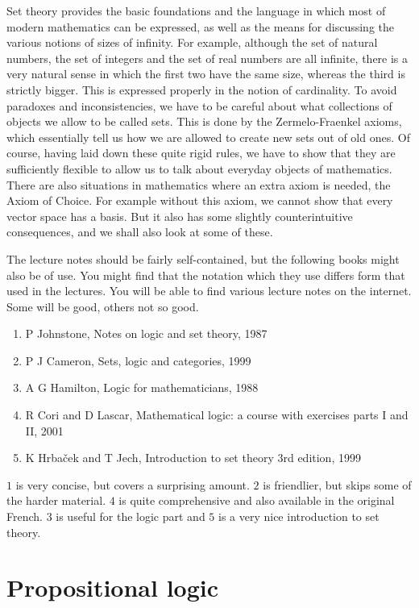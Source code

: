 \documentclass{article}
\theoremstyle{definition}\newtheorem{definition}{Definition}[subsection]
\theoremstyle{definition}\newtheorem{remark}[definition]{Remark}
\theoremstyle{definition}\newtheorem*{example}{Example}
\theoremstyle{definition}\newtheorem*{note}{Note}
\begin{document}
Set theory provides the basic foundations and the language in which most of modern mathematics can be expressed, as well as the means for discussing the various notions of sizes of infinity. For example, although the set of natural numbers, the set of integers and the set of real numbers are all infinite, there is a very natural sense in which the first two have the same size, whereas the third is strictly bigger. This is expressed properly in the notion of cardinality. To avoid paradoxes and inconsistencies, we have to be careful about what collections of objects we allow to be called sets. This is done by the Zermelo-Fraenkel axioms, which essentially tell us how we are allowed to create new sets out of old ones. Of course, having laid down these quite rigid rules, we have to show that they are sufficiently flexible to allow us to talk about everyday objects of mathematics. There are also situations in mathematics where an extra axiom is needed, the Axiom of Choice. For example without this axiom, we cannot show that every vector space has a basis. But it also has some slightly counterintuitive consequences, and we shall also look at some of these.

The lecture notes should be fairly self-contained, but the following books might also be of use. You might find that the notation which they use differs form that used in the lectures. You will be able to find various lecture notes on the internet. Some will be good, others not so good.

\begin{enumerate}
\item P Johnstone, Notes on logic and set theory, 1987
\item P J Cameron, Sets, logic and categories, 1999
\item A G Hamilton, Logic for mathematicians, 1988
\item R Cori and D Lascar, Mathematical logic: a course with exercises parts I and II, 2001
\item K Hrbaček and T Jech, Introduction to set theory 3rd edition, 1999
\end{enumerate}

$ 1 $ is very concise, but covers a surprising amount. $ 2 $ is friendlier, but skips some of the harder material. $ 4 $ is quite comprehensive and also available in the original French. $ 3 $ is useful for the logic part and $ 5 $ is a very nice introduction to set theory.

\section{Propositional logic}
\end{document}
